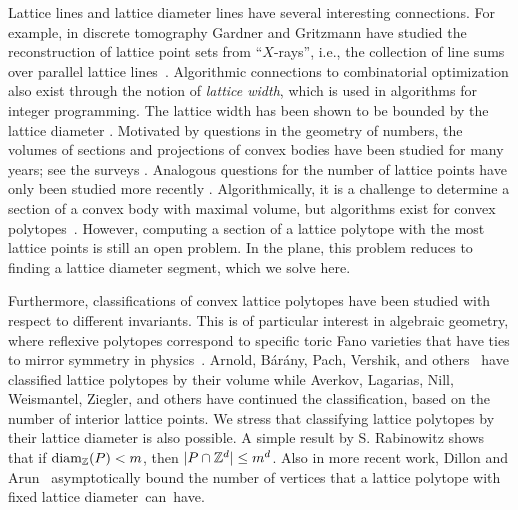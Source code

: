 Lattice lines and lattice diameter lines have several interesting connections. For example, in discrete tomography Gardner and Gritzmann have studied the reconstruction of lattice point sets from ``$X$-rays'', i.e., the collection of line sums over parallel lattice lines~\cite{gardnergritzmann97}. Algorithmic connections to combinatorial optimization also exist through the notion of \emph{lattice width}, which is used in algorithms for integer programming. The lattice width has been shown to be bounded by the lattice diameter \cite{Barany_Furedi}. Motivated by questions in the geometry of numbers, the volumes of sections and projections of convex bodies have been studied for many years; see the surveys \cite{giannopoulos2023inequalities, nayar2023extremal}. Analogous questions for the number of lattice points have only been studied more recently \cite{gard05,freyerhenk22,freyerhenk24}. Algorithmically, it is a challenge to determine a section of a convex body with maximal volume, but algorithms exist for convex polytopes~\cite{BDLM}. However, computing a section of a lattice polytope with the most lattice points is still an open problem. In the plane, this problem reduces to finding a lattice diameter segment, which we solve here. 


Furthermore, classifications of convex lattice polytopes have been studied with respect to different invariants. This is of particular interest in algebraic geometry, where reflexive polytopes correspond to specific toric Fano varieties that have ties to mirror symmetry in physics~\cite{batyrev1999classification, kasprzyk2006toric}. Arnold, B\'ar\'any, Pach, Vershik, and others~\cite{arno80, bara92, bara92a} have classified lattice polytopes by their volume while Averkov, Lagarias, Nill, Weismantel, Ziegler, and others \cite{lagariasZiegler1991bounds, averkov2011maximal, nillziegler2011projecting} have continued the classification, based on the number of interior lattice points. We stress that classifying lattice polytopes by their lattice diameter is also possible. A simple result by S. Rabinowitz \cite{rabi89} shows that if $\operatorname{diam_{\mathbb{Z}}}(P)<m$, then $|P \cap \mathbb{Z}^d| \leq m^d$.
Also in more recent work, Dillon and Arun~\cite{HollowP} asymptotically bound the number of vertices that a lattice polytope with fixed lattice \mbox{diameter can have.}


